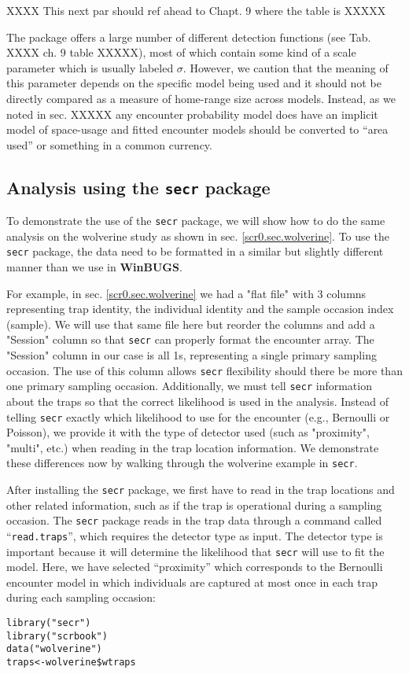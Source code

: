 {XXXX This next par should ref ahead to Chapt. 9 where the table is  XXXXX


The package \secr offers a large number of different detection
functions (see Tab. XXXX ch. 9 table XXXXX), most of which contain
some kind of a scale parameter which is usually labeled
$\sigma$. However, we caution that the meaning of this parameter
depends on the specific model being used and it should not be directly
compared as a measure of home-range size across models. Instead, as we
noted in sec. XXXXX any encounter probability model does have an
implicit model of space-usage and fitted encounter models should be
converted to ``area used'' or something in a common currency. 



\subsection{ Analysis using the \mbox{\tt secr} package}

To demonstrate the use of the \mbox{\tt secr} package, we will show how to do the
same analysis on the wolverine study as shown in
sec. \ref{scr0.sec.wolverine}. To use 
the \mbox{\tt secr} package, the data need to be formatted in a similar but
slightly different manner than we use in {\bf WinBUGS}.  

For example, in sec. \ref{scr0.sec.wolverine} we had a "flat file" with 3 columns
representing trap identity,
the individual identity and the sample occasion index (sample).  We will use that same file
here but reorder the columns and add a "Session" column so that \mbox{\tt secr} can properly format 
the encounter array. The "Session" column in our case is all 1s, representing a single primary 
sampling occasion.   The use of this column allows \mbox{\tt secr} flexibility should there be more than
one primary sampling occasion.   Additionally, we must tell \mbox{\tt secr} information about the traps 
so that the correct likelihood is used in the analysis.  Instead of telling \mbox{\tt secr} exactly which likelihood
to use for the encounter (e.g., Bernoulli or Poisson), we provide it with the type of 
detector used (such as "proximity", "multi", etc.) when reading in the trap location information.   
We demonstrate these differences now by walking through
the wolverine example in \mbox{\tt secr}.


After installing
the \mbox{\tt secr} package, we first have to read in the trap locations and
other related information, such as if the trap is operational during a
sampling occasion.  The \mbox{\tt secr} package reads in the trap data through a
command called ``\mbox{\tt read.traps}'', which requires the detector type as
input.  The detector type is important because it will determine the
likelihood that \mbox{\tt secr} will use to fit the model.  Here, we have
selected ``proximity'' which corresponds to the Bernoulli encounter
model in which individuals are captured at most once in
each trap during each sampling occasion:
{\small
\begin{verbatim}
library("secr")
library("scrbook")
data("wolverine")
traps<-wolverine$wtraps


\end{verbatim}}}
